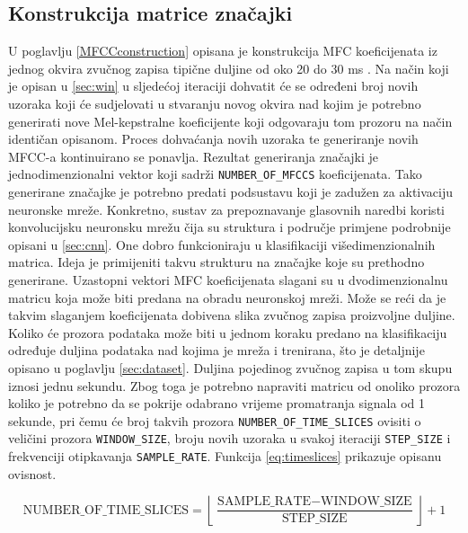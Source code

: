 \subsection{Konstrukcija matrice značajki}
\label{sec:featureImage}
U poglavlju \ref{MFCCconstruction} opisana je konstrukcija MFC koeficijenata iz jednog
okvira zvučnog zapisa tipične duljine od oko 20 do 30 ms \cite{wardentinyml}. 
Na način koji je opisan u
\ref{sec:win} u sljedećoj iteraciji dohvatit će se određeni broj novih uzoraka koji će
sudjelovati u stvaranju novog okvira nad kojim je 
potrebno generirati nove Mel-kepstralne koeficijente koji odgovaraju tom prozoru na način
identičan opisanom. Proces dohvaćanja novih uzoraka te generiranje novih MFCC-a kontinuirano
se ponavlja. Rezultat generiranja značajki je 
jednodimenzionalni vektor koji sadrži \texttt{NUMBER\_OF\_MFCCS} koeficijenata. Tako generirane značajke
je potrebno predati podsustavu koji je zadužen za aktivaciju neuronske mreže. Konkretno,
sustav za prepoznavanje glasovnih naredbi koristi konvolucijsku neuronsku mrežu čija su struktura i
područje primjene podrobnije opisani u \ref{sec:cnn}. One dobro funkcioniraju u klasifikaciji
višedimenzionalnih matrica. Ideja je primijeniti takvu strukturu na značajke koje su prethodno
generirane. Uzastopni vektori MFC koeficijenata slagani su u dvodimenzionalnu matricu koja
može biti predana na obradu neuronskoj mreži. Može se reći da je takvim slaganjem koeficijenata dobivena slika
zvučnog zapisa proizvoljne duljine. Koliko će prozora podataka može biti u jednom 
koraku predano na klasifikaciju određuje duljina podataka nad kojima je mreža i trenirana, što je detaljnije
opisano u poglavlju \ref{sec:dataset}. Duljina pojedinog zvučnog zapisa u tom skupu iznosi jednu sekundu. 
Zbog toga je potrebno napraviti matricu od onoliko prozora koliko je potrebno da se pokrije odabrano 
vrijeme promatranja signala od 1 sekunde, pri čemu će broj takvih prozora \texttt{NUMBER\_OF\_TIME\_SLICES} ovisiti
o veličini prozora \texttt{WINDOW\_SIZE},
broju novih uzoraka u svakoj iteraciji \texttt{STEP\_SIZE} i frekvenciji otipkavanja
\texttt{SAMPLE\_RATE}. Funkcija \eqref{eq:timeslices} prikazuje opisanu ovisnost.

\begin{equation}
    \label{eq:timeslices}
    \text{NUMBER\_OF\_TIME\_SLICES} = \left\lfloor \frac{\text{SAMPLE\_RATE} - \text{WINDOW\_SIZE}}{\text{STEP\_SIZE}} \right\rfloor + 1
\end{equation}

